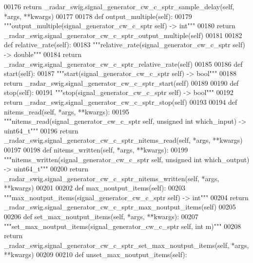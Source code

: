 \begin{DoxyCode}
{{{00176         \textcolor{keywordflow}{return} \_radar\_swig.signal\_generator\_cw\_c\_sptr\_sample\_delay(self, *args, **kwargs)
00177 
00178     \textcolor{keyword}{def }output_multiple(self):
00179         \textcolor{stringliteral}{"""output\_multiple(signal\_generator\_cw\_c\_sptr self) -> int"""}
00180         \textcolor{keywordflow}{return} \_radar\_swig.signal\_generator\_cw\_c\_sptr\_output\_multiple(self)
00181 
00182     \textcolor{keyword}{def }relative_rate(self):
00183         \textcolor{stringliteral}{"""relative\_rate(signal\_generator\_cw\_c\_sptr self) -> double"""}
00184         \textcolor{keywordflow}{return} \_radar\_swig.signal\_generator\_cw\_c\_sptr\_relative\_rate(self)
00185 
00186     \textcolor{keyword}{def }start(self):
00187         \textcolor{stringliteral}{"""start(signal\_generator\_cw\_c\_sptr self) -> bool"""}
00188         \textcolor{keywordflow}{return} \_radar\_swig.signal\_generator\_cw\_c\_sptr\_start(self)
00189 
00190     \textcolor{keyword}{def }stop(self):
00191         \textcolor{stringliteral}{"""stop(signal\_generator\_cw\_c\_sptr self) -> bool"""}
00192         \textcolor{keywordflow}{return} \_radar\_swig.signal\_generator\_cw\_c\_sptr\_stop(self)
00193 
00194     \textcolor{keyword}{def }nitems_read(self, *args, **kwargs):
00195         \textcolor{stringliteral}{"""nitems\_read(signal\_generator\_cw\_c\_sptr self, unsigned int which\_input) -> uint64\_t"""}
00196         \textcolor{keywordflow}{return} \_radar\_swig.signal\_generator\_cw\_c\_sptr\_nitems\_read(self, *args, **kwargs)
00197 
00198     \textcolor{keyword}{def }nitems_written(self, *args, **kwargs):
00199         \textcolor{stringliteral}{"""nitems\_written(signal\_generator\_cw\_c\_sptr self, unsigned int which\_output) -> uint64\_t"""}
00200         \textcolor{keywordflow}{return} \_radar\_swig.signal\_generator\_cw\_c\_sptr\_nitems\_written(self, *args, **kwargs)
00201 
00202     \textcolor{keyword}{def }max_noutput_items(self):
00203         \textcolor{stringliteral}{"""max\_noutput\_items(signal\_generator\_cw\_c\_sptr self) -> int"""}
00204         \textcolor{keywordflow}{return} \_radar\_swig.signal\_generator\_cw\_c\_sptr\_max\_noutput\_items(self)
00205 
00206     \textcolor{keyword}{def }set_max_noutput_items(self, *args, **kwargs):
00207         \textcolor{stringliteral}{"""set\_max\_noutput\_items(signal\_generator\_cw\_c\_sptr self, int m)"""}
00208         \textcolor{keywordflow}{return} \_radar\_swig.signal\_generator\_cw\_c\_sptr\_set\_max\_noutput\_items(self, *args, **kwargs)
00209 
00210     \textcolor{keyword}{def }unset_max_noutput_items(self):
}}}
\end{DoxyCode}
